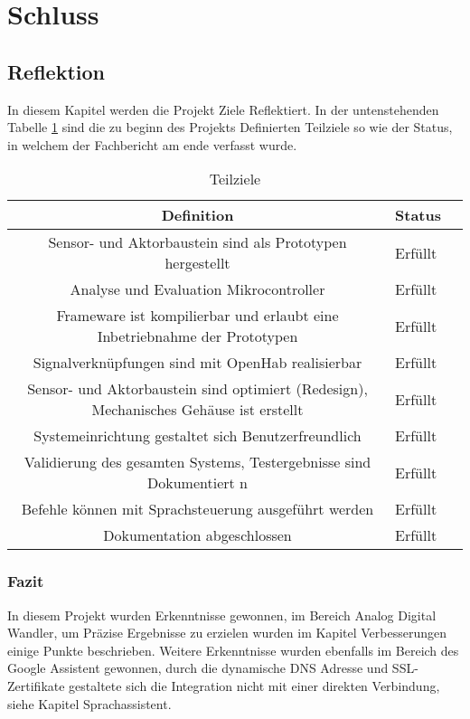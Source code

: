 \section{Schluss}

\subsection{Reflektion}

In diesem Kapitel werden die Projekt Ziele Reflektiert. In der untenstehenden Tabelle \ref{tab: Teilziele} sind die zu beginn des Projekts Definierten Teilziele so wie der Status, in welchem der Fachbericht am ende verfasst wurde.
\begin{table}[h!]
	\begin{tabular}{|c|l|c|}
		\hline 
		Definition & Status \\ 
		\hline 
		Sensor- und Aktorbaustein sind als Prototypen hergestellt& Erfüllt \\ 
		\hline 
		Analyse und Evaluation Mikrocontroller & Erfüllt \\ 
		\hline 
		Frameware ist kompilierbar und erlaubt eine Inbetriebnahme der Prototypen & Erfüllt \\ 
		\hline 
		Signalverknüpfungen sind mit OpenHab realisierbar & Erfüllt \\ 
		\hline 
		Sensor- und Aktorbaustein sind optimiert (Redesign), Mechanisches Gehäuse ist erstellt  & Erfüllt \\ 
		\hline 
		Systemeinrichtung gestaltet sich Benutzerfreundlich & Erfüllt \\ 
		\hline 
		Validierung des gesamten Systems, Testergebnisse sind Dokumentiert n & Erfüllt \\ 
		\hline 
		Befehle können mit Sprachsteuerung ausgeführt werden & Erfüllt \\ 
		\hline 
		Dokumentation abgeschlossen & Erfüllt \\ 
		\hline 
		\end{tabular}
	\caption{Teilziele}
	\label{tab: Teilziele}	 
\end{table}



\subsubsection{Fazit}
 In diesem Projekt wurden Erkenntnisse gewonnen, im Bereich Analog Digital Wandler, um Präzise Ergebnisse zu erzielen wurden im Kapitel Verbesserungen einige Punkte beschrieben. Weitere Erkenntnisse wurden ebenfalls im Bereich des Google Assistent gewonnen, durch die dynamische DNS Adresse  und SSL-Zertifikate gestaltete sich die Integration nicht mit einer direkten Verbindung, siehe Kapitel Sprachassistent. 

